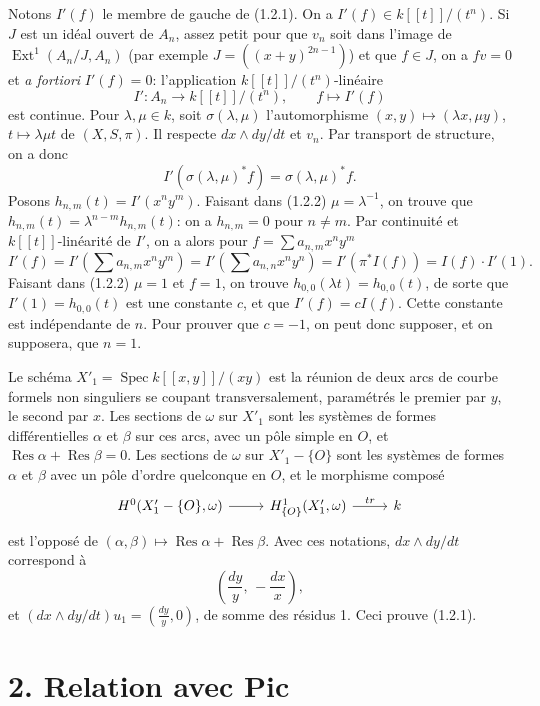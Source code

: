 \documentclass[11pt,leqno]{article}
\DeclareMathOperator{\Spec}{Spec}
\DeclareMathOperator{\Ext}{Ext}
\DeclareMathOperator{\Res}{Res}
\begin{document}
Notons $I'(f)$ le membre de gauche de (1.2.1). On a $I'(f)\in k[[t]]/(t^n)$. Si $J$ est un idéal ouvert de $A_n$, assez petit pour que $v_n$ soit dans l'image de $\Ext^1(A_n/J,A_n)$ (par exemple $J=((x+y)^{2n-1})$) et que $f\in J$, on a $fv=0$ et \emph{a fortiori} $I'(f)=0$: l'application $k[[t]]/(t^n)$-linéaire
\[
        I':A_n\longrightarrow k[[t]]/(t^n),\qquad f\longmapsto I'(f)
\]
est continue.
\clearpage
Pour $\lambda,\mu\in k$, soit $\sigma(\lambda,\mu)$ l'automorphisme $(x,y)\mapsto(\lambda x,\mu y)$, $t\mapsto\lambda\mu t$ de $(X,S,\pi)$. Il respecte $dx\wedge dy/dt$ et $v_n$. Par transport de structure, on a donc
\begin{equation}
        I'(\sigma(\lambda,\mu)^*f)=\sigma(\lambda,\mu)^*f. \tag{1.2.2}
\end{equation}
Posons $h_{n,m}(t)=I'(x^ny^m)$. Faisant dans (1.2.2) $\mu=\lambda^{-1}$, on trouve que $h_{n,m}(t)=\lambda^{n-m}h_{n,m}(t)$: on a $h_{n,m}=0$ pour $n\ne m$. Par continuité et $k[[t]]$-linéarité de $I'$, on a alors pour $f=\sum a_{n,m}x^ny^m$
\[
        I'(f)=I'\left(\sum a_{n,m}x^ny^m\right)
             =I'\left(\sum a_{n,n}x^ny^n\right)
             =I'(\pi^*I(f))=I(f)\cdot I'(1).
\]
Faisant dans (1.2.2) $\mu=1$ et $f=1$, on trouve $h_{0,0}(\lambda t)=h_{0,0}(t)$, de sorte que $I'(1)=h_{0,0}(t)$ est une constante $c$, et que $I'(f)=cI(f)$. Cette constante est indépendante de $n$. Pour prouver que $c=-1$, on peut donc supposer, et on supposera, que $n=1$.

Le schéma $X'_1=\Spec k[[x,y]]/(xy)$ est la réunion de deux arcs de courbe formels non singuliers se coupant transversalement, paramétrés le premier par $y$, le second par $x$. Les sections de $\omega$ sur $X'_1$ sont les systèmes de formes différentielles $\alpha$ et $\beta$ sur ces arcs, avec un pôle simple en $O$, et $\Res\alpha+\Res\beta=0$. Les sections de $\omega$ sur $X'_1-\{O\}$ sont les systèmes de formes $\alpha$ et $\beta$ avec un pôle d'ordre quelconque en $O$, et le morphisme composé
\[
\begin{tikzcd}[column sep=2.5em]
H^0(X'_1-\{O\},\omega) \arrow[r] & H^1_{\{O\}}(X'_1,\omega) \arrow[r,"tr"] & k
\end{tikzcd}
\]
est l'opposé de $(\alpha,\beta)\mapsto\Res\alpha+\Res\beta$. Avec ces notations, $dx\wedge dy/dt$ correspond à
\[
        \left(\frac{dy}{y},\,-\frac{dx}{x}\right),
\]
et $(dx\wedge dy/dt)u_1=\left(\frac{dy}{y},0\right)$, de somme des résidus 1. Ceci prouve (1.2.1).

\section*{2. Relation avec Pic}
\end{document}
